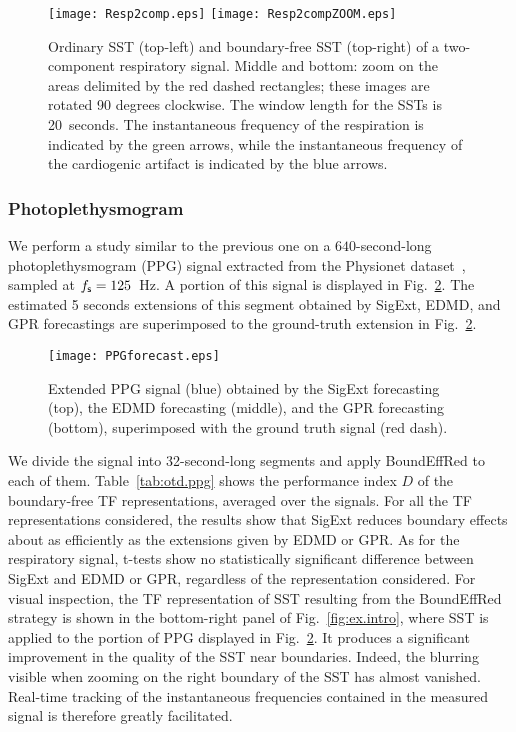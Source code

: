 {\begin{figure}
\centering
\texttt{[image: Resp2comp.eps]}
\texttt{[image: Resp2compZOOM.eps]}
\caption{Ordinary SST (top-left) and boundary-free SST (top-right) of a two-component respiratory signal. Middle and bottom: zoom on the areas delimited by the red dashed rectangles; these images are rotated 90 degrees clockwise. The window length for the SSTs is 20~seconds. The instantaneous frequency of the respiration is indicated by the green arrows, while the instantaneous frequency of the cardiogenic artifact is indicated by the blue arrows.}
\label{fig:resp.2.sst}
\end{figure}
}

\subsubsection{Photoplethysmogram}
\label{ssse:ppg}
We perform a study similar to the previous one on a $640$-second-long photoplethysmogram (PPG) signal extracted from the Physionet dataset~\cite{Pimentel17toward, Goldberger00physiobank}, sampled at $f_{\mathsf s}=125$~Hz. A portion of this signal is displayed in Fig.~\ref{fig:ppg}. The estimated 5 seconds extensions of this segment obtained by {\sf SigExt}, EDMD, and GPR forecastings  are superimposed to the ground-truth extension in Fig.~\ref{fig:ppg}.

\begin{figure}
\texttt{[image: PPGforecast.eps]}
\caption{Extended PPG signal (blue) obtained by the {\sf SigExt} forecasting (top), the EDMD forecasting (middle), and the GPR forecasting (bottom), superimposed with the ground truth signal (red dash).}
\label{fig:ppg}
\end{figure}

We divide the signal into 32-second-long segments and apply {\sf BoundEffRed} to each of them. Table~\ref{tab:otd.ppg} shows the performance index $D$ of the boundary-free TF representations, averaged over the signals. For all the TF representations considered, the results show that {\sf SigExt} reduces boundary effects about as efficiently as the extensions given by EDMD or GPR. As for the respiratory signal, t-tests show no statistically significant difference between {\sf SigExt} and EDMD or GPR, regardless of the representation considered. For visual inspection, the TF representation of SST resulting from the {\sf BoundEffRed} strategy is shown in the bottom-right panel of Fig.~\ref{fig:ex.intro}, where SST is applied to the portion of PPG displayed in Fig.~\ref{fig:ppg}. It produces a significant improvement in the quality of the SST near boundaries. Indeed, the blurring visible when zooming on the right boundary of the SST has almost vanished. Real-time tracking of the instantaneous frequencies contained in the measured signal is therefore greatly facilitated.

